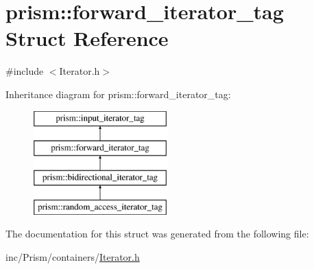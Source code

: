 \hypertarget{structprism_1_1forward__iterator__tag}{}\section{prism\+:\+:forward\+\_\+iterator\+\_\+tag Struct Reference}
\label{structprism_1_1forward__iterator__tag}


{\ttfamily \#include $<$Iterator.\+h$>$}

Inheritance diagram for prism\+:\+:forward\+\_\+iterator\+\_\+tag\+:\begin{figure}[H]
\begin{center}
\leavevmode
\includegraphics[height=4.000000cm]{structprism_1_1forward__iterator__tag}
\end{center}
\end{figure}


The documentation for this struct was generated from the following file\+:\begin{DoxyCompactItemize}
\item 
inc/\+Prism/containers/\hyperlink{_iterator_8h}{Iterator.\+h}\end{DoxyCompactItemize}
